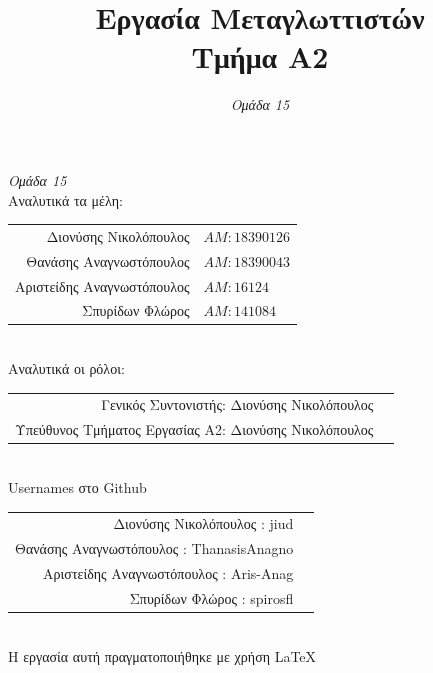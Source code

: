 \documentclass[14pt]{extarticle}
\title{\bf Εργασία Μεταγλωττιστών \\ Τμήμα Α2}
\author{
  \emph{Ομάδα 15}
}
\begin{document}
\begin{titlepage}
  \maketitle
  \begin{center}
    \large \emph{Ομάδα 15}
    \\
    Αναλυτικά τα μέλη:
\vspace{5mm}
  \begin{tabular}{r l}
    \\Διονύσης Νικολόπουλος & $AM: 18390126$
    \\Θανάσης Αναγνωστόπουλος & $AM: 18390043$
    \\Αριστείδης Αναγνωστόπουλος & $AM: 16124$
    \\Σπυρίδων Φλώρος & $AM: 141084$
  \end{tabular}
\vspace{5mm}
    \\
    Αναλυτικά οι ρόλοι:
    \\
\vspace{5mm}
  \begin{tabular}{r l}
    \small Γενικός Συντονιστής:   Διονύσης Νικολόπουλος
    \\
    \small Υπεύθυνος Τμήματος Εργασίας Α2: Διονύσης Νικολόπουλος
  \end{tabular}
\vspace{5mm}
\\
  \textlatin{Usernames} στο \textlatin{Github}
\\
  \vspace{5mm}
  \begin{tabular}{r l}
    \small Διονύσης Νικολόπουλος : \textlatin{jiud}
    \\
    \small Θανάσης Αναγνωστόπουλος : \textlatin{ThanasisAnagno}
    \\
    \small Αριστείδης Αναγνωστόπουλος : \textlatin{Aris-Anag}
    \\
    \small Σπυρίδων Φλώρος : \textlatin{spirosfl}
  \end{tabular}
  \\
\vspace*{\fill}
    \footnotesize{Η εργασία αυτή πραγματοποιήθηκε με χρήση \LaTeX}
  \end{center}
\end{titlepage}

\tableofcontents
\clearpage
\end{document}
